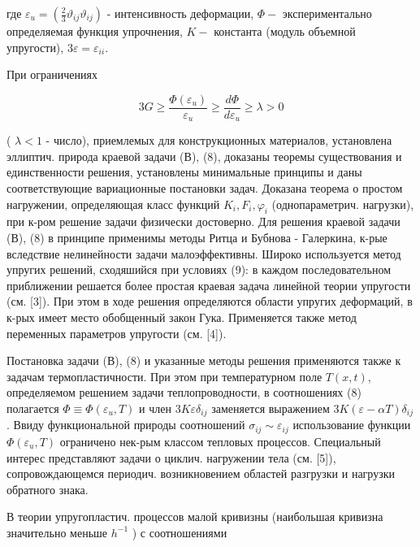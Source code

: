 \documentclass[10pt]{article}
\begin{document}
где $\varepsilon_{u}=\left(\frac{2}{3} \vartheta_{i j} \vartheta_{i j}\right)$ - интенсивность деформации, $\Phi-$ экспериментально определяемая функция упрочнения, $K-$ константа (модуль объемной упругости), $3 \varepsilon=\varepsilon_{i i}$.



При ограничениях



\[

3 G \geqslant \frac{\Phi\left(\varepsilon_{u}\right)}{\varepsilon_{u}} \geqslant \frac{d \Phi}{d \varepsilon_{u}} \geqslant \lambda>0

\]



( $\lambda<1$ - число), приемлемых для конструкционных материалов, установлена эллиптич. природа краевой задачи (В), (8), доказаны теоремы существования и единственности решения, установлены минимальные принципы и даны соответствующие вариационные постановки задач. Доказана теорема о простом нагружении, определяющая класс функций $K_{i}, F_{i}, \varphi_{i}$ (однопараметрич. нагрузки), при к-ром решение задачи физически достоверно. Для решения краевой задачи (В), (8) в принципе применимы методы Ритца и Бубнова - Галеркина, к-рые вследствие нелинейности задачи малоэффективны. Широко используется метод упругих решений, сходяшийся при условиях (9): в каждом последовательном приближении решается более простая краевая задача линейной теории упругости (см. [3]). При этом в ходе решения определяются области упругих деформаций, в к-рых имеет место обобщенный закон Гука. Применяется также метод переменных параметров упругости (см. [4]).



Постановка задачи (В), (8) и указанные методы решения применяются также к задачам термопластичности. При этом при температурном поле $T(x, t)$, определяемом решением задачи теплопроводности, в соотношениях (8) полагается $\Phi \equiv \Phi\left(\varepsilon_{u}, T\right)$ и член $3 K \varepsilon \delta_{i j}$ заменяется выражением $3 K(\varepsilon-\alpha T) \delta_{i j}$. Ввиду функциональной природы соотношений $\sigma_{i j} \sim \varepsilon_{i j}$ использование функции $\Phi\left(\varepsilon_{u}, T\right)$ ограничено нек-рым классом тепловых процессов. Специальный интерес представляют задачи о циклич. нагружении тела (см. [5]), сопровождающемся периодич. возникновением областей разгрузки и нагрузки обратного знака.



В теории упругопластич. процессов малой кривизны (наибольшая кривизна значительно меньше $h^{-1}$ ) с соотношениями
\end{document}
